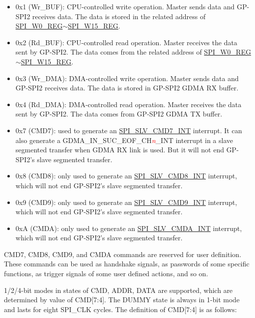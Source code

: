 \documentclass[main\_\_EN.tex]{subfiles}
\begin{document}
\begin{itemize}
    \item \label{cmd:wrbuf} 0x1 (Wr\_BUF): CPU-controlled write operation. Master sends data and GP-SPI2 receives data. The data is stored in the related address of \hyperref[regdesc:SPIW0REG]{SPI\_W0\_REG}$\sim$\hyperref[regdesc:SPIW15REG]{SPI\_W15\_REG}.
    \item \label{cmd:rdbuf} 0x2 (Rd\_BUF): CPU-controlled read operation. Master receives the data sent by GP-SPI2. The data comes from the related address of \hyperref[regdesc:SPIW0REG]{SPI\_W0\_REG}$\sim$\hyperref[regdesc:SPIW15REG]{SPI\_W15\_REG}.
    \item \label{cmd:wrdma} 0x3 (Wr\_DMA): DMA-controlled write operation. Master sends data and GP-SPI2 receives data. The data is stored in GP-SPI2 GDMA RX buffer.
    \item \label{cmd:rddma} 0x4 (Rd\_DMA): DMA-controlled read operation. Master receives the data sent by GP-SPI2. The data comes from GP-SPI2 GDMA TX buffer.
    \item \label{cmd:CMD7} 0x7 (CMD7): used to generate an \hyperref[int:SPISLVCMD7INT]{SPI\_SLV\_CMD7\_INT} interrupt. It can also generate a GDMA\_IN\_SUC\_EOF\_CH\textcolor{red}{\it{n}}\_INT  interrupt in a slave segmented transfer when GDMA RX link is used. But it will not end GP-SPI2’s slave segmented transfer.
    \item 0x8 (CMD8): only used to generate an \hyperref[int:SPISLVCMD8INT]{SPI\_SLV\_CMD8\_INT} interrupt, which will not end GP-SPI2’s slave segmented transfer.
    \item 0x9 (CMD9): only used to generate an \hyperref[int:SPISLVCMD9INT]{SPI\_SLV\_CMD9\_INT} interrupt, which will not end GP-SPI2’s slave segmented transfer.
    \item 0xA (CMDA): only used to generate an \hyperref[int:SPISLVCMDAINT]{SPI\_SLV\_CMDA\_INT} interrupt, which will not end GP-SPI2’s slave segmented transfer.
\end{itemize}

CMD7, CMD8, CMD9, and CMDA commands are reserved for user definition. These commands can be used as handshake signals, as passwords of some specific functions, as trigger signals of some user defined actions, and so on.

1/2/4-bit modes in states of CMD, ADDR, DATA are supported, which are determined by value of CMD[7:4]. The DUMMY state is always in 1-bit mode and lasts for eight SPI\_CLK cycles. The definition of CMD[7:4] is as follows:
\end{document}
